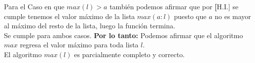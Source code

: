 Para el Caso en que $max(l) > a$ también podemos afirmar que por \textbf[H.I.] se cumple tenemos el valor máximo de la lista $max(a:l)$ puesto que $a$ no es mayor al máximo del resto de la lista, luego la función termina. \\ 
\newline
Se cumple para ambos casos.
\newline
\textbf{Por lo tanto: } Podemos afirmar que el algoritmo $max$ regresa el valor máximo para toda lista $l$.\\
El algoritmo $max(l)$ es parcialmente completo y correcto.

